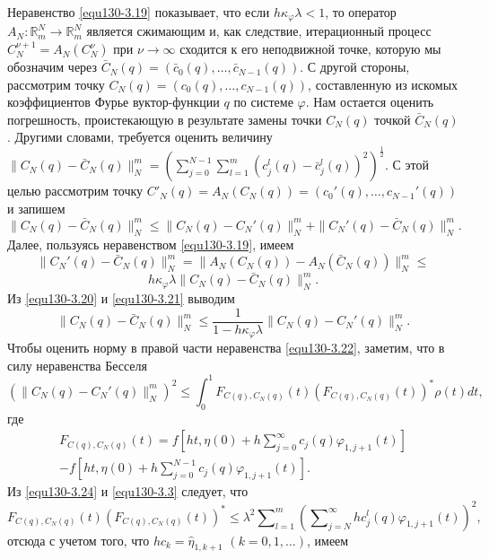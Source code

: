 Неравенство \eqref{equ130-3.19} показывает, что если $h\kappa_\varphi\lambda<1$, то оператор  $A_N:\mathbb{R}^N_m\to \mathbb{R}^N_m$ является сжимающим и, как следствие, итерационный процесс $C_N^{\nu+1}=A_N(C_N^{\nu})$  при $\nu\to\infty$ сходится к его неподвижной точке, которую мы обозначим через  $\bar C_N(q)=(\bar c_0(q),\ldots,\bar c_{N-1}(q))$. С другой стороны, рассмотрим точку $C_N(q)=(c_0(q),\ldots,c_{N-1}(q))$, составленную из искомых коэффициентов Фурье вуктор-функции $q$ по системе $\varphi$. Нам остается оценить погрешность, проистекающую в результате замены точки $C_N(q)$ точкой $\bar C_N(q)$. Другими словами, требуется оценить величину
$\|C_N(q)-\bar C_N(q)\|_N^m= \left(\sum_{j=0}^{N-1}\sum\nolimits_{l=1}^m(c_j^l(q)-\bar c_j^l(q))^2\right)^\frac12$. С этой целью рассмотрим точку $C'_N(q)=A_N(C_N(q))=(c_0'(q),\ldots,c_{N-1}'(q))$ и запишем
\begin{equation}\label{equ130-3.20}
\|C_N(q)-\bar C_N(q)\|_N^m\le \|C_N(q)- C_N'(q)\|_N^m+\|C_N'(q)-\bar C_N(q)\|_N^m.
\end{equation}
Далее, пользуясь неравенством \eqref{equ130-3.19}, имеем
$$
\|C_N'(q)-\bar C_N(q)\|_N^m=\|A_N(C_N(q))-A_N(\bar C_N(q))\|_N^m\le
$$
\begin{equation}\label{equ130-3.21}
h\kappa_\varphi\lambda\|C_N(q)-\bar C_N(q)\|_N^m.
\end{equation}
Из \eqref{equ130-3.20} и \eqref{equ130-3.21} выводим
\begin{equation}\label{equ130-3.22}
\|C_N(q)-\bar C_N(q)\|_N^m\le \frac1{1-h\kappa_\varphi\lambda}\|C_N(q)- C_N'(q)\|_N^m.
\end{equation}
Чтобы оценить норму в правой части неравенства \eqref{equ130-3.22}, заметим, что в силу неравенства Бесселя
\begin{equation}\label{equ130-3.23}
(\|C_N(q)- C_N'(q)\|_N^m)^2\le \int_{0}^1F_{C(q),C_N(q)}(t)(F_{C(q),C_N(q)}(t))^*\rho(t) dt,
\end{equation}
где
\begin{multline}\label{equ130-3.24}
 F_{C(q),C_N(q)}(t)=f\left[ht,\eta(0)+ h\sum\nolimits_{j=0}^\infty c_j(q)\varphi_{1,j+1}(t)\right] \\
  -f\left[ht,\eta(0)+ h\sum\nolimits_{j=0}^{N-1}c_j(q)\varphi_{1,j+1}(t)\right].
\end{multline}
Из \eqref{equ130-3.24} и \eqref{equ130-3.3} следует, что
$$
F_{C(q),C_N(q)}(t)(F_{C(q),C_N(q)}(t))^*\le \lambda^2 \sum\nolimits_{l=1}^m  \left(\sum\nolimits_{j=N}^\infty hc_j^l(q)\varphi_{1,j+1}(t)\right)^2,
$$
отсюда с учетом того, что $hc_k=\hat \eta_{1,k+1}$ $(k=0,1,\ldots)$, имеем
